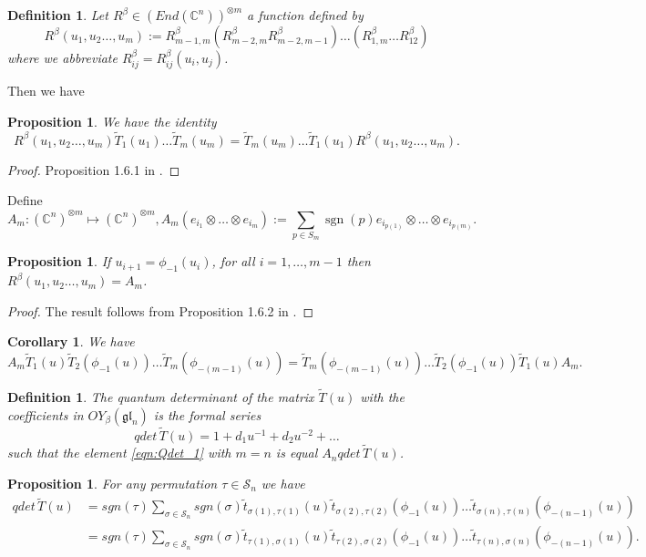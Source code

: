 \documentclass[10pt]{article}%
\numberwithin{equation}{section}
\newtheorem{cor}[thm]{Corollary}
\newtheorem{prop}[thm]{Proposition}
\newtheorem{defin}[thm]{Definition}
\newcommand{\gl}{{\mathfrak{gl}}}
\def\sgn{\mathop{sgn}}
\begin{document}
\begin{defin} Let $R^{\beta}\in (End(\mathbb{C}^n))^{\otimes m}$ a function defined by
\begin{equation}
    R^{\beta}(u_1,u_2\ldots,u_m):=R^{\beta}_{m-1,m}\left(R^{\beta}_{m-2,m}R^{\beta}_{m-2,m-1}\right)\ldots \left(R^{\beta}_{1,m}\ldots R^{\beta}_{12}\right)
\end{equation}  
where we abbreviate $R^{\beta}_{ij}=R^{\beta}_{ij}(u_i,u_j)$.
\end{defin}
Then we have
\begin{prop}\label{prop:Qdet_principal}
We have the identity
\begin{equation}
    R^{\beta}(u_1,u_2\ldots,u_m)\tilde{T}_1(u_1)\ldots \tilde{T}_{m}(u_m)=\tilde{T}_{m}(u_m)\ldots \tilde{T}_1(u_1) R^{\beta}(u_1,u_2\ldots,u_m).
\end{equation}
\end{prop}
\begin{proof}
    Proposition 1.6.1 in \cite{Molevbook}.
\end{proof}
Define
\[
A_m:(\mathbb{C}^n)^{\otimes m}\mapsto (\mathbb{C}^n)^{\otimes m}, A_m(e_{i_1}\otimes\ldots \otimes e_{i_m}):=\sum\limits_{p\in S_m} \sgn(p) e_{i_{p(1)}}\otimes\ldots \otimes e_{i_{p(m)}}.
\]
\begin{prop}
If $u_{i+1}=\phi_{-1}(u_i)$, for all $i=1,\ldots, m-1$ then
 $R^{\beta}(u_1,u_2\ldots,u_m)=A_m$.
\end{prop}
\begin{proof}
    The result follows from Proposition 1.6.2 in \cite{Molevbook}.
\end{proof}
\begin{cor}
    We have 
    \begin{equation}\label{eqn:Qdet_1}
    A_m\tilde{T}_1(u)\tilde{T}_2(\phi_{-1}(u))\ldots  \tilde{T}_{m}(\phi_{-(m-1)}(u))=\tilde{T}_{m}(\phi_{-(m-1)}(u))\ldots \tilde{T}_2(\phi_{-1}(u))\tilde{T}_1(u) A_m.
    \end{equation}
\end{cor}
\begin{defin}
    The quantum determinant of the matrix $\tilde{T}(u)$ with the coefficients in $OY_{\beta}(\gl_n)$ is the formal series
    \[
    qdet\,\tilde{T}(u)=1+ d_1 u^{-1}+ d_2 u^{-2}+\ldots
    \]
    such that the element \eqref{eqn:Qdet_1} with $m=n$ is equal $A_n qdet\,\tilde{T}(u)$.
\end{defin}
\begin{prop}
    For any permutation $\tau\in \mathcal{S}_{n}$ we have
    \begin{eqnarray}
     qdet\,\tilde{T}(u) &= sgn(\tau)\sum\limits_{\sigma\in \mathcal{S}_{n}} sgn(\sigma) \tilde{t}_{\sigma(1),\tau(1)}(u) \tilde{t}_{\sigma(2),\tau(2)}(\phi_{-1}(u))\ldots \tilde{t}_{\sigma(n),\tau(n)}(\phi_{-(n-1)}(u))  \nonumber\\
     &= sgn(\tau)\sum\limits_{\sigma\in \mathcal{S}_{n}} sgn(\sigma) \tilde{t}_{\tau(1),\sigma(1)}(u) \tilde{t}_{\tau(2),\sigma(2)}(\phi_{-1}(u))\ldots \tilde{t}_{\tau(n),\sigma(n)}(\phi_{-(n-1)}(u)).\nonumber
    \end{eqnarray}
        
\end{prop}
\end{document}
